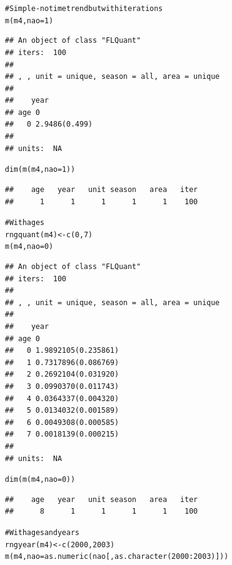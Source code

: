 \documentclass[a4paper,english,10pt]{article}\usepackage[]{graphicx}\usepackage[]{color}
\makeatletter
\newcommand{\hlnum}[1]{\textcolor[rgb]{0.2,0.2,0.2}{#1}}%
\newcommand{\hlcom}[1]{\textcolor[rgb]{0.2,0.267,0.4}{#1}}%
\newcommand{\hlopt}[1]{\textcolor[rgb]{0.2,0.2,0.2}{#1}}%
\newcommand{\hlstd}[1]{\textcolor[rgb]{0,0,0}{#1}}%
\newcommand{\hlkwb}[1]{\textcolor[rgb]{0.361,0.506,0.596}{#1}}%
\newcommand{\hlkwc}[1]{\textcolor[rgb]{0.361,0.506,0.596}{#1}}%
\newcommand{\hlkwd}[1]{\textcolor[rgb]{0.361,0.506,0.596}{#1}}%
\newenvironment{kframe}{%
 \def\at@end@of@kframe{}%
 \ifinner\ifhmode%
  \def\at@end@of@kframe{\end{minipage}}%
  \begin{minipage}{\columnwidth}%
 \fi\fi%
 \def\FrameCommand##1{\hskip\@totalleftmargin \hskip-\fboxsep
 \colorbox{shadecolor}{##1}\hskip-\fboxsep
     \hskip-\linewidth \hskip-\@totalleftmargin \hskip\columnwidth}%
 \MakeFramed {\advance\hsize-\width
   \@totalleftmargin\z@ \linewidth\hsize
   \@setminipage}}%
 {\par\unskip\endMakeFramed%
 \at@end@of@kframe}
\newenvironment{knitrout}{}{} %
\makeatother
\begin{document}
\begin{knitrout}
\color{fgcolor}\begin{kframe}
\begin{alltt}
\hlcom{# Simple - no time trend but with iterations}
\hlkwd{m}\hlstd{(m4,} \hlkwc{nao}\hlstd{=}\hlnum{1}\hlstd{)}
\end{alltt}
\begin{verbatim}
## An object of class "FLQuant"
## iters:  100 
## 
## , , unit = unique, season = all, area = unique
## 
##    year
## age 0            
##   0 2.9486(0.499)
## 
## units:  NA
\end{verbatim}
\begin{alltt}
\hlkwd{dim}\hlstd{(}\hlkwd{m}\hlstd{(m4,} \hlkwc{nao}\hlstd{=}\hlnum{1}\hlstd{))}
\end{alltt}
\begin{verbatim}
##    age   year   unit season   area   iter 
##      1      1      1      1      1    100
\end{verbatim}
\begin{alltt}
\hlcom{# With ages}
\hlkwd{rngquant}\hlstd{(m4)} \hlkwb{<-} \hlkwd{c}\hlstd{(}\hlnum{0}\hlstd{,}\hlnum{7}\hlstd{)}
\hlkwd{m}\hlstd{(m4,} \hlkwc{nao}\hlstd{=}\hlnum{0}\hlstd{)}
\end{alltt}
\begin{verbatim}
## An object of class "FLQuant"
## iters:  100 
## 
## , , unit = unique, season = all, area = unique
## 
##    year
## age 0                  
##   0 1.9892105(0.235861)
##   1 0.7317896(0.086769)
##   2 0.2692104(0.031920)
##   3 0.0990370(0.011743)
##   4 0.0364337(0.004320)
##   5 0.0134032(0.001589)
##   6 0.0049308(0.000585)
##   7 0.0018139(0.000215)
## 
## units:  NA
\end{verbatim}
\begin{alltt}
\hlkwd{dim}\hlstd{(}\hlkwd{m}\hlstd{(m4,} \hlkwc{nao}\hlstd{=}\hlnum{0}\hlstd{))}
\end{alltt}
\begin{verbatim}
##    age   year   unit season   area   iter 
##      8      1      1      1      1    100
\end{verbatim}
\begin{alltt}
\hlcom{# With ages and years}
\hlkwd{rngyear}\hlstd{(m4)} \hlkwb{<-} \hlkwd{c}\hlstd{(}\hlnum{2000}\hlstd{,} \hlnum{2003}\hlstd{)}
\hlkwd{m}\hlstd{(m4,} \hlkwc{nao}\hlstd{=}\hlkwd{as.numeric}\hlstd{(nao[,}\hlkwd{as.character}\hlstd{(}\hlnum{2000}\hlopt{:}\hlnum{2003}\hlstd{)]))}
\end{alltt}

\end{kframe}
\end{knitrout}
\end{document}
